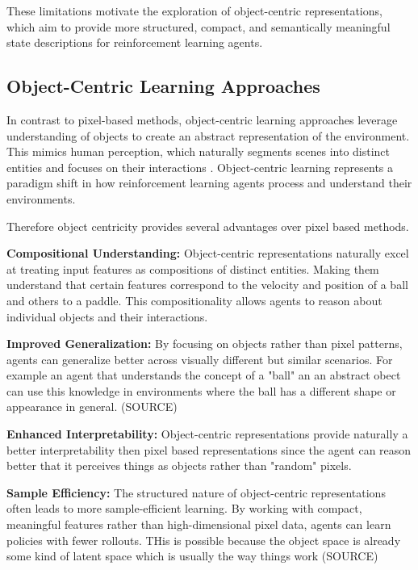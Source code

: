 \documentclass[
	english,
	ruledheaders=section,
	class=report,
	thesis={type=master},
	accentcolor=9c,
	custommargins=true,
	marginpar=false,
	parskip=half-,
	fontsize=11pt,
]{tudapub}
\begin{document}
These limitations motivate the exploration of object-centric representations, which aim to provide more structured, compact, and semantically meaningful state descriptions for reinforcement learning agents.

\subsection{Object-Centric Learning Approaches}
\label{subsec:oc_approaches}

In contrast to pixel-based methods, object-centric learning approaches leverage understanding of objects to create an abstract representation of the environment. This mimics human perception,
 which naturally segments scenes into distinct entities and focuses on their interactions \cite{nanbo2021learningobjectcentricrepresentationsmultiobject}. Object-centric learning represents a paradigm shift in how reinforcement learning agents process and understand their environments.

Therefore object centricity provides several advantages over pixel based methods.

\textbf{Compositional Understanding:} Object-centric representations naturally excel at treating input features as compositions of distinct entities. Making them understand that certain features
correspond to the velocity and position of a ball and others to a paddle. This compositionality allows agents to reason about individual objects and their interactions.

\textbf{Improved Generalization:} By focusing on objects rather than pixel patterns, agents can generalize better across visually different but similar scenarios. For example an agent that
 understands the concept of a "ball" an an abstract obect can use this knowledge in environments where the ball has a different shape or appearance in general. (SOURCE)

\textbf{Enhanced Interpretability:} Object-centric representations provide naturally a better interpretability then pixel based representations since the agent can reason better that it perceives things as objects rather than "random" pixels.

\textbf{Sample Efficiency:} The structured nature of object-centric representations often leads to more sample-efficient learning. By working with compact, meaningful features rather than high-dimensional
 pixel data, agents can learn policies with fewer rollouts. THis is possible because the object space is already some kind of latent space which is usually the way things work (SOURCE)
\end{document}

